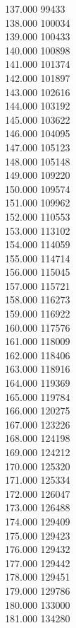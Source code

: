 { 137.000	99433 \\
 138.000	100034 \\
 139.000	100433 \\
 140.000	100898 \\
 141.000	101374 \\
 142.000	101897 \\
 143.000	102616 \\
 144.000	103192 \\
 145.000	103622 \\
 146.000	104095 \\
 147.000	105123 \\
 148.000	105148 \\
 149.000	109220 \\
 150.000	109574 \\
 151.000	109962 \\
 152.000	110553 \\
 153.000	113102 \\
 154.000	114059 \\
 155.000	114714 \\
 156.000	115045 \\
 157.000	115721 \\
 158.000	116273 \\
 159.000	116922 \\
 160.000	117576 \\
 161.000	118009 \\
 162.000	118406 \\
 163.000	118916 \\
 164.000	119369 \\
 165.000	119784 \\
 166.000	120275 \\
 167.000	123226 \\
 168.000	124198 \\
 169.000	124212 \\
 170.000	125320 \\
 171.000	125334 \\
 172.000	126047 \\
 173.000	126488 \\
 174.000	129409 \\
 175.000	129423 \\
 176.000	129432 \\
 177.000	129442 \\
 178.000	129451 \\
 179.000	129786 \\
 180.000	133000 \\
 181.000	134280 \\
}
